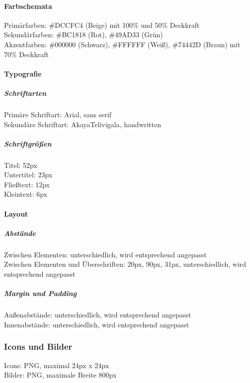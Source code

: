 \paragraph{Farbschemata}
Primärfarben: \#DCCFC4 (Beige) mit 100\% und 50\% Deckkraft\\
Sekundärfarben: \#BC1818 (Rot), \#49AD33 (Grün)\\
Akzentfarben: \#000000 (Schwarz), \#FFFFFF (Weiß), \#74442D (Braun) mit 70\% Deckkraft

\paragraph{Typografie}
\subparagraph{Schriftarten}
Primäre Schriftart: Arial, sans serif\\
Sekundäre Schriftart: AkayaTelivigala, handwritten

\subparagraph{Schriftgrößen}
Titel: 52px\\
Untertitel: 23px\\
Fließtext: 12px\\
Kleintext: 6px

\paragraph{Layout}
\subparagraph{Abstände}
Zwischen Elementen: unterschiedlich, wird entsprechend angepasst\\
Zwischen Elementen und Überschriften: 20px, 90px, 31px, unterschiedlich, wird entsprechend angepasst

\subparagraph{Margin und Padding}
Außenabstände: unterschiedlich, wird entsprechend angepasst\\
Innenabstände: unterschiedlich, wird entsprechend angepasst

\subsubsection*{Icons und Bilder}
Icons: PNG, maximal 24px x 24px\\
Bilder: PNG, maximale Breite 800px

